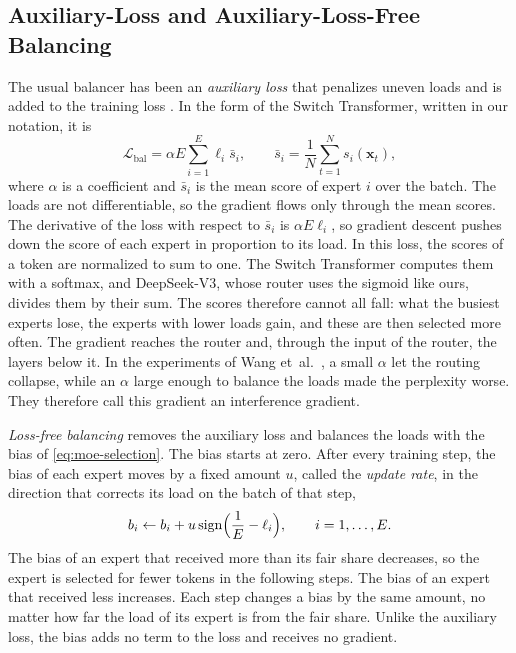 \subsection{Auxiliary-Loss and Auxiliary-Loss-Free Balancing}
\label{sec:background-loss-free}
The usual balancer has been an \emph{auxiliary loss} that penalizes uneven loads and is added to the training loss \cite{shazeer2017outrageously, lepikhin2021gshard, fedus2022switch}. In the form of the Switch Transformer, written in our notation, it is
\begin{equation}[eq:aux-loss]{}
  \mathcal{L}_{\mathrm{bal}} = \alpha E \sum_{i=1}^{E} \ell_i \bar{s}_i, \qquad \bar{s}_i = \frac{1}{N} \sum_{t=1}^{N} s_i(\mathbf{x}_t),
\end{equation}
where $\alpha$ is a coefficient and $\bar{s}_i$ is the mean score of expert $i$ over the batch. The loads are not differentiable, so the gradient flows only through the mean scores. The derivative of the loss with respect to $\bar{s}_i$ is $\alpha E \ell_i$, so gradient descent pushes down the score of each expert in proportion to its load. In this loss, the scores of a token are normalized to sum to one. The Switch Transformer computes them with a softmax, and DeepSeek-V3, whose router uses the sigmoid like ours, divides them by their sum. The scores therefore cannot all fall: what the busiest experts lose, the experts with lower loads gain, and these are then selected more often. The gradient reaches the router and, through the input of the router, the layers below it. In the experiments of Wang et~al.~\cite{wang2024lossfree}, a small $\alpha$ let the routing collapse, while an $\alpha$ large enough to balance the loads made the perplexity worse. They therefore call this gradient an interference gradient.

\emph{Loss-free balancing} \cite{wang2024lossfree} removes the auxiliary loss and balances the loads with the bias of \cref{eq:moe-selection}. The bias starts at zero. After every training step, the bias of each expert moves by a fixed amount $u$, called the \emph{update rate}, in the direction that corrects its load on the batch of that step,
\begin{equation}[eq:bias-update]{}
  b_i \leftarrow b_i + u \operatorname{sign}\Bigl( \frac{1}{E} - \ell_i \Bigr), \qquad i = 1, \dots, E.
\end{equation}
The bias of an expert that received more than its fair share decreases, so the expert is selected for fewer tokens in the following steps. The bias of an expert that received less increases. Each step changes a bias by the same amount, no matter how far the load of its expert is from the fair share. Unlike the auxiliary loss, the bias adds no term to the loss and receives no gradient.

